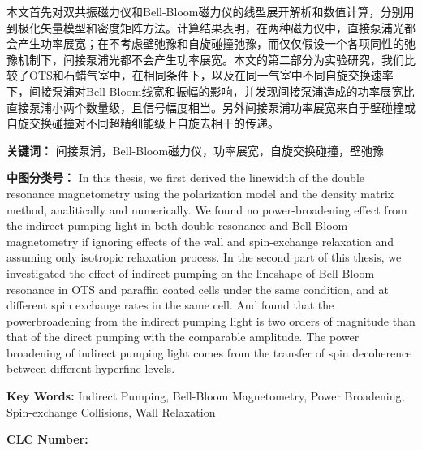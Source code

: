 


\iffalse
原子磁力仪在测量时间为$T$，测量原子数为$N$，相干时间为$\tau$时的灵敏度为$\delta B=\frac{1}{g \mu_B}\frac{\hbar}{\sqrt{N \tau T}}$。其中$\mu_B$为玻尔磁子，$g$为基态的朗德$g$因子，$\hbar$为普朗克常数。增大基态的相干时间$\tau$的方法是减少弛豫，如壁弛豫，自旋碰撞弛豫等。在磁力仪信号上的表现则为更大的信号幅度和更小的展宽。
\fi
本文首先对双共振磁力仪和Bell-Bloom磁力仪的线型展开解析和数值计算，分别用到极化矢量模型和密度矩阵方法。计算结果表明，在两种磁力仪中，直接泵浦光都会产生功率展宽；在不考虑壁弛豫和自旋碰撞弛豫，而仅仅假设一个各项同性的弛豫机制下，间接泵浦光都不会产生功率展宽。本文的第二部分为实验研究，我们比较了OTS和石蜡气室中，在相同条件下，以及在同一气室中不同自旋交换速率下，间接泵浦对Bell-Bloom线宽和振幅的影响，并发现间接泵浦造成的功率展宽比直接泵浦小两个数量级，且信号幅度相当。另外间接泵浦功率展宽来自于壁碰撞或自旋交换碰撞对不同超精细能级上自旋去相干的传递。

\iffalse
我们在镀有OTS和石蜡抗弛豫镀膜的气室中，在不同温度下，即不同自旋交换碰撞率下，对Bell-Bloom磁力仪的线型进行详细研究。从实验结果上推测间接泵浦过程中泵浦光会通过自旋交换碰撞和壁碰撞传递功率展宽，且其引起的展宽相比直接泵浦小约两个数量级。
\fi

\bigskip
\noindent \textbf{关键词：\hspace{\Han}}
间接泵浦，Bell-Bloom磁力仪，功率展宽，自旋交换碰撞，壁弛豫

\bigskip
\noindent \textbf{中图分类号：\hspace{\Han}}
In this thesis, we first derived the linewidth of the double resonance magnetometry using the polarization model and the density matrix method, analitically and numerically. We found no power-broadening effect from the indirect pumping light in both double resonance and Bell-Bloom magnetometry if ignoring effects of the wall and spin-exchange relaxation and assuming only isotropic relaxation process. In the second part of this thesis, we investigated the effect of indirect pumping on the lineshape of Bell-Bloom resonance in OTS and paraffin coated cells under the same condition, and at different spin exchange rates in the same cell. And found that the powerbroadening from the indirect pumping light is two orders of magnitude than that of the direct pumping with the comparable amplitude. The power broadening of indirect pumping light comes from the transfer of spin decoherence between different hyperfine levels.  
\iffalse
The sensitivity of a magnetic-field measurement for a magnetomery performed for a time $T$ with an ensemble of $N$ atoms with coherence time $\tau$ is $\delta B=\frac{1}{g \mu_B}\frac{\hbar}{\sqrt{N \tau T}}$, where $\mu_B$ is the Bohr magneton, g is the ground-state Landé factor, and $\hbar$ is Planck’s constant. To increase the coherence time $\tau$, one has to reduce the relaxation of polarization including the wall relaxation, spin-exchange relaxation and so on. So a larger amplitude of Lorentz signal with narrower linewidth is observed.
\fi

\bigskip
\noindent  \textbf{Key Words:\hspace{\Han}}
Indirect Pumping, Bell-Bloom Magnetometry, Power Broadening, Spin-exchange Collisions, Wall Relaxation

\bigskip
\noindent \textbf{CLC Number:\hspace{\Han}  }

